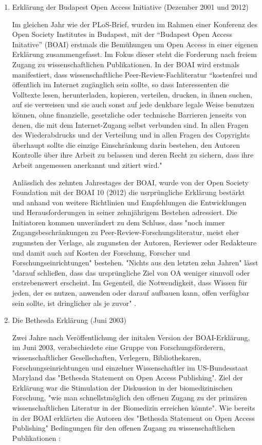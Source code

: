 \begin{enumerate}
\item Erklärung der Budapest Open Access Initiative (Dezember 2001 und 2012)

Im gleichen Jahr wie der PLoS-Brief, wurden im Rahmen einer Konferenz des Open Society Institutes in Budapest, mit der “Budapest Open Access Initative” (BOAI)\cite{boai_2012} erstmals die Bemühungen um Open Access in einer eigenen Erklärung zusammengefasst\cite{cite:21a}. Im Fokus dieser steht die Forderung nach freiem Zugang zu wissenschaftlichen Publikationen. In der BOAI wird erstmals manifestiert, dass wissenschaftliche Peer-Review-Fachliteratur “kostenfrei und öffentlich im Internet zugänglich sein sollte, so dass Interessenten die Volltexte lesen, herunterladen, kopieren, verteilen, drucken, in ihnen suchen, auf sie verweisen und sie auch sonst auf jede denkbare legale Weise benutzen können, ohne finanzielle, gesetzliche oder technische Barrieren jenseits von denen, die mit dem Internet-Zugang selbst verbunden sind. In allen Fragen des Wiederabdrucks und der Verteilung und in allen Fragen des Copyrights überhaupt sollte die einzige Einschränkung darin bestehen, den Autoren Kontrolle über ihre Arbeit zu belassen und deren Recht zu sichern, dass ihre Arbeit angemessen anerkannt und zitiert wird."\cite{boai_2012} 

Anlässlich des zehnten Jahrestages der BOAI, wurde von der Open Society Foundation mit der BOAI 10 (2012) die usrprüngliche Erklärung bestärkt und anhand von weitere Richtlinien und Empfehlungen die Entwicklungen und Herausforderungen in seiner zehnjährigem Bestehen adressiert. Die Initiatoren kommen unverändert zu dem Schluss, dass "noch immer Zugangsbeschränkungen zu Peer-Review-Forschungsliteratur, meist eher zugunsten der Verlage, als zugunsten der Autoren, Reviewer oder Redakteure und damit auch auf Kosten der Forschung, Forscher und Forschungseinrichtungen" \cite{boai_2012} bestehen. "Nichts aus den letzten zehn Jahren" lässt "darauf schließen, dass das ursprüngliche Ziel von OA weniger sinnvoll oder erstrebenswert erscheint. Im Gegenteil, die Notwendigkeit, dass Wissen für jeden, der es nutzen, anwenden oder darauf aufbauen kann, offen verfügbar sein sollte, ist dringlicher als je zuvor" \cite{boai_2012}.

\item Die Bethesda Erklärung (Juni 2003)

Zwei Jahre nach Veröffentlichung der initalen Version der BOAI-Erklärung, im Juni 2003, verabschiedete eine Gruppe von Forschungsförderern, wissenschaftlicher Gesellschaften, Verlegern, Bibliothekaren, Forschungseinrichtungen und einzelner Wissenschaftler im US-Bundesstaat Maryland das "Bethesda Statement on Open Access Publishing".\cite{suchen} Ziel der Erklärung war die Stimulation der Diskussion in der biomedizinischen Forschung, "wie man schnellstmöglich den offenen Zugang zu der primären wissenschaftlichen Literatur in der Biomedizin erreichen könnte"\cite{suchen}. Wie bereits in der BOAI erklärten die Autoren des "Bethesda Statement on Open Access Publishing" Bedingungen für den offenen Zugang zu wissenschaftlichen Publikationen \cite{suchen}: 


\end{enumerate}
